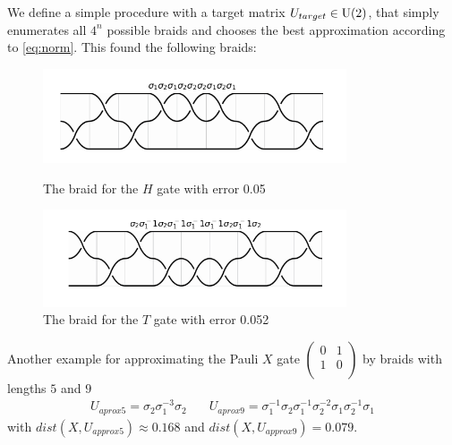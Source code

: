 \documentclass{article}
\begin{document}
We define a simple procedure with a target matrix $U_{target} \in \mathrm{U}(2)$, that simply enumerates all $4^n$ possible braids and chooses the best approximation according to \cref{eq:norm}. This found the following braids:
\setcounter{figure}{2}
\begin{figure}[h!]
  \centering
  \begin{minipage}{0.45\textwidth}
    \centering
      \includegraphics[width=0.8\textwidth]{images/H_braid.png}
      \caption{The braid for the $H$ gate with error 0.05}
      \label{fig:hbraid}
  \end{minipage}
  \hfill
  \begin{minipage}{0.45\textwidth}
      \centering
      \includegraphics[width=0.8\textwidth]{images/T_braid2.png}
      \caption{The braid for the $T$ gate with error 0.052}
      \label{fig:tbraid}
  \end{minipage}
\end{figure}

Another example for approximating the Pauli $X$ gate $\begin{pmatrix}
  0 &  1 \\
  1 &  0 \\
\end{pmatrix}$ by braids with lengths $5$ and $9$
\begin{align*}
  U_{aprox5} = \sigma_2 \sigma_1^{-3} \sigma_2 &\quad U_{aprox9} = \sigma_1^{-1}\sigma_2\sigma_1^{-1}\sigma_2^{-2}\sigma_1\sigma_2^{-1}\sigma_{1}
\end{align*}
with $dist(X,U_{approx5}) \approx 0.168$ and $dist(X,U_{approx9}) = 0.079$.
\end{document}
